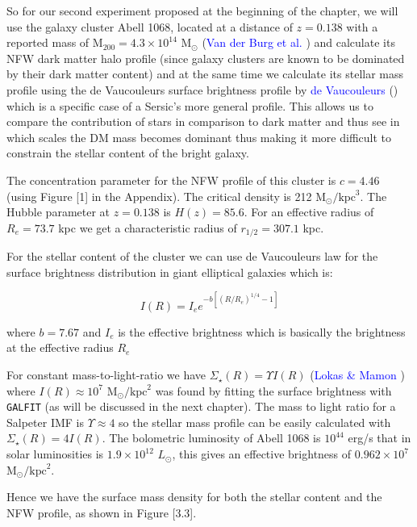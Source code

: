 So for our second experiment proposed at the beginning of the chapter, we will use the galaxy cluster Abell 1068, located at a distance of $z=0.138$ with a reported mass of $\text{M}_{200}=4.3\times 10^{14}$ $\text{M}_{\odot}$ (\textcolor{blue}{Van der Burg et al.} \citeyear{Reference2}) and calculate its NFW dark matter halo profile (since galaxy clusters are known to be dominated by their dark matter content) and at the same time we calculate its stellar mass profile using the de Vaucouleurs surface brightness profile by \textcolor{blue}{de Vaucouleurs} (\citeyear{Reference32}) which is a specific case of a Sersic's more general profile. This allows us to compare the contribution of stars in comparison to dark matter and thus see in which scales the DM mass becomes dominant thus making it more difficult to constrain the stellar content of the bright galaxy.

The concentration parameter for the NFW profile of this cluster is $c=4.46$ (using Figure [1] in the Appendix). The critical density is 212 $\text{M}_{\odot}/\text{kpc}^{3}$. The Hubble parameter at $z=0.138$ is $H(z)=85.6$. For an effective radius of $R_{e}=73.7$ kpc we get a characteristic radius of $r_{1/2}=307.1$ kpc.

For the stellar content of the cluster we can use de Vaucouleurs law for the surface brightness distribution in giant elliptical galaxies which is:

\begin{equation}
I(R)=I_{e}e^{-b\left[\left(R/R_{e}\right)^{1/4}-1\right]}
\end{equation}

where $b=7.67$ and $I_{e}$ is the effective brightness which is basically the brightness at the effective radius $R_{e}$

For constant mass-to-light-ratio we have $\Sigma_{\star}(R)= \Upsilon I(R)$ (\textcolor{blue}{Lokas \& Mamon} \citeyear{Reference14}) where  $I(R)\approx 10^{7}$ $\text{M}_{\odot}/\text{kpc}^{2}$ was found by fitting the surface brightness with \texttt{GALFIT} (as will be discussed in the next chapter). The mass to light ratio for a Salpeter IMF is $\Upsilon\approx 4$ so the stellar mass profile can be easily calculated with  $\Sigma_{\star}(R)= 4I(R)$. The bolometric luminosity of Abell 1068 is $10^{44}$ erg/s that in solar luminosities is $1.9\times 10^{12}$ $L_{\odot}$, this gives an effective brightness of $0.962\times 10^{7}$ $\text{M}_{\odot}/\text{kpc}^2$. 

Hence we have the surface mass density for both the stellar content and the NFW profile, as shown in Figure [3.3].

